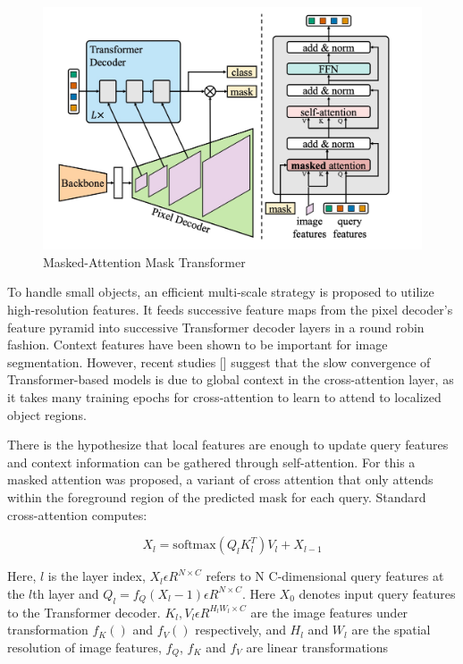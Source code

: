 \begin{figure}[h!]
    \centering
    \includegraphics[scale=0.8]{Figures/MaskAttentionMaskTransformer.jpg}
    \caption{Masked-Attention Mask Transformer}
    \label{fig:mamt}
\end{figure}


\newpage
To handle small objects, an efficient multi-scale strategy is proposed to utilize high-resolution features. It feeds successive feature maps from the 
pixel decoder’s feature pyramid into successive Transformer  decoder layers in a round robin fashion. 
Context features have been shown to be important for image segmentation. However, recent studies [] suggest that the slow convergence of 
Transformer-based models is due to global context in the cross-attention layer, as it takes many training epochs for cross-attention to learn to attend to 
localized object regions. 

There is the hypothesize that local features are enough to update query features and context information can be gathered through self-attention. 
For this a masked attention was proposed, a variant of cross attention that only attends within the foreground region of the predicted mask for each query. 
Standard cross-attention computes:

\[X_l = \text{softmax}(Q_l K_l^T) V_l + X_{l-1}\]

Here, $l$ is the layer index, $X_l \epsilon R^{N \times C}$ refers to N C-dimensional query features at the $l$th layer and 
$Q_l = f_Q(X_l-1) \epsilon R^{N \times C} $. Here $X_0$ denotes input query features to the Transformer decoder. $K_l, V_l \epsilon R^{H_l W_l \times C}$ are the 
image features under transformation $f_K()$ and $f_{V}()$ respectively, and $H_l$ and $W_l$ are the spatial resolution of image features, $f_Q$, $f_K$ and $f_V$ are 
linear transformations


